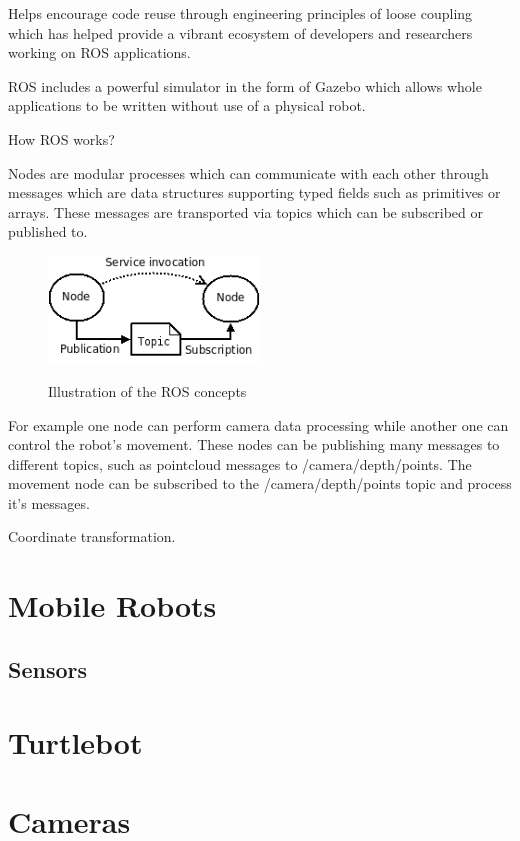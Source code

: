 \documentclass{mproj}
\begin{document}
Helps encourage code reuse through engineering principles of loose coupling which has helped provide a vibrant ecosystem of developers and researchers working on ROS applications.

ROS includes a powerful simulator in the form of Gazebo which allows whole applications to be written without use of a physical robot.

How ROS works?

Nodes are modular processes which can communicate with each other through messages which are data structures supporting typed fields such as primitives or arrays. These messages are transported via topics which can be subscribed or published to. 

\begin{figure}
  \caption{Illustration of the ROS concepts}
  \centering
  \includegraphics[width=0.5\textwidth]{images/ROS_basic_concepts.png}
  \label{fig:ROS diagram}
\end{figure}

For example one node can perform camera data processing while another one can control the robot's movement. These nodes can be publishing many messages to different topics, such as pointcloud messages to /camera/depth/points. The movement node can be subscribed to the /camera/depth/points topic and process it's messages. 



Coordinate transformation.
 
\section{Mobile Robots}
\subsection{Sensors}
\section{Turtlebot}
\section{Cameras}
\end{document}
